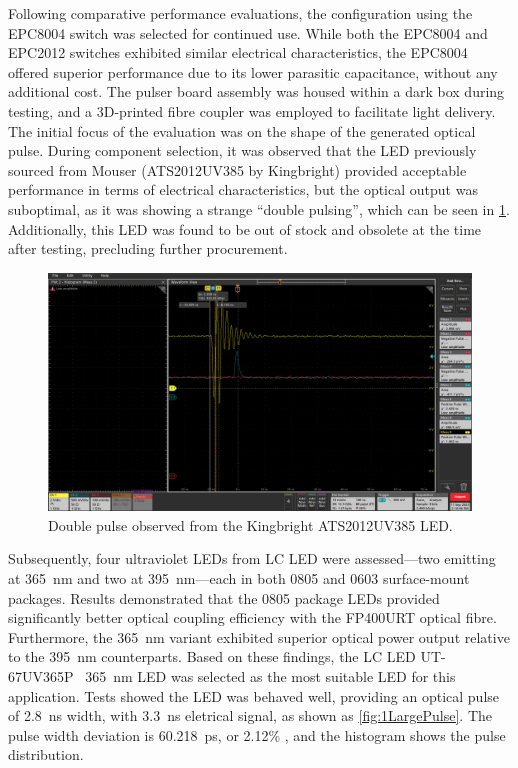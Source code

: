 \documentclass[a4paper,11pt]{article}
\begin{document}
Following comparative performance evaluations, the configuration using the EPC8004 switch was selected for continued use. While both the EPC8004 and EPC2012 switches exhibited similar electrical characteristics, the EPC8004 offered superior performance due to its lower parasitic capacitance, without any additional cost.
The pulser board assembly was housed within a dark box during testing, and a 3D-printed fibre coupler was employed to facilitate light delivery. The initial focus of the evaluation was on the shape of the generated optical pulse.
During component selection, it was observed that the LED previously sourced from Mouser (ATS2012UV385 by Kingbright) provided acceptable performance in terms of electrical characteristics, but the optical output was suboptimal, as it was showing a strange ``double pulsing'', which can be seen in \cref{fig:doublepulse}. Additionally, this LED was found to be out of stock and obsolete at the time after testing, precluding further procurement. 

\begin{figure}[h]
\centering
\includegraphics[width=\textwidth]{doublepulse}
\caption{Double pulse observed from the Kingbright ATS2012UV385 LED.}\label{fig:doublepulse}
\end{figure}

Subsequently, four ultraviolet LEDs from LC LED were assessed—two emitting at 365~nm and two at 395~nm—each in both 0805 and 0603 surface-mount packages. Results demonstrated that the 0805 package LEDs provided significantly better optical coupling efficiency with the FP400URT optical fibre. Furthermore, the 365~nm variant exhibited superior optical power output relative to the 395~nm counterparts.
Based on these findings, the LC LED UT-67UV365P~\cite{ut-67uv365p} 365~nm LED was selected as the most suitable LED for this application. Tests showed the LED was behaved well, providing an optical pulse of 2.8~ns width, with 3.3~ns eletrical signal, as shown as \cref{fig:1LargePulse}. The pulse width deviation is 60.218~ps, or 2.12\% , and the histogram shows the pulse distribution.
\end{document}
